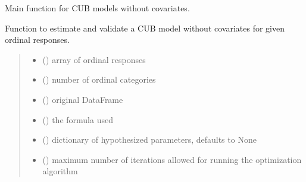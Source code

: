 \documentclass[letterpaper,10pt,english]{sphinxmanual}
\begin{document}
\begin{fulllineitems}
\label{\detokenize{cubmods:cubmods.cub.mle}}
\pysigstartsignatures
{}
\pysigstopsignatures
\sphinxAtStartPar
Main function for CUB models without covariates.

\sphinxAtStartPar
Function to estimate and validate a CUB model without covariates for given ordinal responses.
\begin{quote}\begin{description}
\begin{itemize}
\item {} 
\sphinxAtStartPar
{} () \textendash{} array of ordinal responses

\item {} 
\sphinxAtStartPar
{} () \textendash{} number of ordinal categories

\item {} 
\sphinxAtStartPar
{} () \textendash{} original DataFrame

\item {} 
\sphinxAtStartPar
{} () \textendash{} the formula used

\item {} 
\sphinxAtStartPar
{} (\sphinxstyleliteralemphasis{\sphinxupquote{, }}) \textendash{} dictionary of hypothesized parameters, defaults to None

\item {} 
\sphinxAtStartPar
{} () \textendash{} maximum number of iterations allowed for running the optimization algorithm


\end{itemize}
\end{description}
\end{quote}
\end{fulllineitems}
\end{document}
